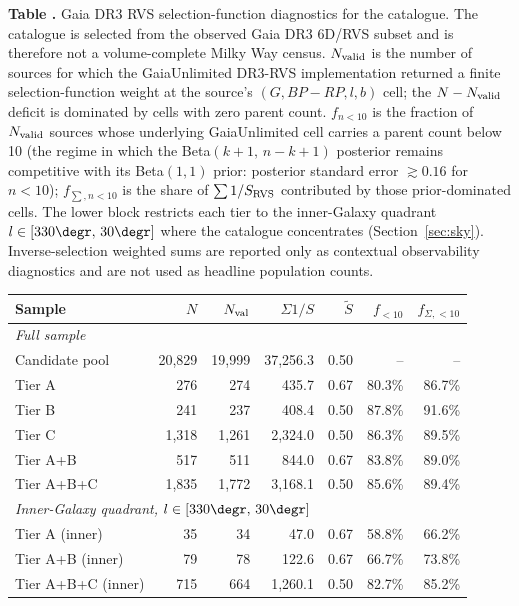 \begin{center}
\label{tab:selection_function}
\begin{minipage}{\columnwidth}
\small\textbf{Table \thetable.} Gaia DR3 RVS selection-function
diagnostics for the catalogue.  The catalogue is selected from the
observed Gaia DR3 6D/RVS subset and is therefore not a volume-complete
Milky Way census.  $N_{\rm valid}$ is the number of sources for which
the GaiaUnlimited DR3-RVS implementation
\citep{CastroGinard2023} returned a finite selection-function weight at the source's $(G, BP{-}RP, l, b)$ cell;
the $N-N_{\rm valid}$ deficit is dominated by cells with zero parent
count.  $f_{n<10}$ is the fraction of $N_{\rm valid}$ sources whose
underlying GaiaUnlimited cell carries a parent count below 10 (the
regime in which the Beta$(k{+}1,\,n{-}k{+}1)$ posterior remains
competitive with its Beta$(1,1)$ prior: posterior standard error
$\gtrsim 0.16$ for $n<10$); $f_{\sum,n<10}$ is the share of
$\sum 1/S_{\rm RVS}$ contributed by those prior-dominated cells.  The
lower block restricts each tier to the inner-Galaxy quadrant
$l \in [330\degr,\,30\degr]$ where the catalogue concentrates
(Section~\ref{sec:sky}).  Inverse-selection weighted sums are reported
only as contextual observability diagnostics and are not used as
headline population counts.
\end{minipage}
\vspace{0.4ex}

\footnotesize
\setlength{\tabcolsep}{1pt}
\begin{tabular}{@{}lrrrrrr@{}}
\hline\hline
Sample & $N$ & $N_{\rm val}$ & $\Sigma 1/S$ & $\tilde S$ & $f_{<10}$ & $f_{\Sigma,<10}$ \\
\hline
\multicolumn{7}{l}{\textit{Full sample}} \\
Candidate pool          & 20{,}829 & 19{,}999 & 37{,}256.3 & 0.50 & --      & --      \\
Tier A                  & 276      & 274      & 435.7      & 0.67 & 80.3\%  & 86.7\%  \\
Tier B                  & 241      & 237      & 408.4      & 0.50 & 87.8\%  & 91.6\%  \\
Tier C                  & 1{,}318  & 1{,}261  & 2{,}324.0  & 0.50 & 86.3\%  & 89.5\%  \\
Tier A+B                & 517      & 511      & 844.0      & 0.67 & 83.8\%  & 89.0\%  \\
Tier A+B+C              & 1{,}835  & 1{,}772  & 3{,}168.1  & 0.50 & 85.6\%  & 89.4\%  \\
\hline
\multicolumn{7}{l}{\textit{Inner-Galaxy quadrant, $l\in[330\degr,\,30\degr]$}} \\
Tier A (inner)          & 35       & 34       & 47.0       & 0.67 & 58.8\%  & 66.2\%  \\
Tier A+B (inner)        & 79       & 78       & 122.6      & 0.67 & 66.7\%  & 73.8\%  \\
Tier A+B+C (inner)      & 715      & 664      & 1{,}260.1  & 0.50 & 82.7\%  & 85.2\%  \\
\hline
\end{tabular}
\end{center}
